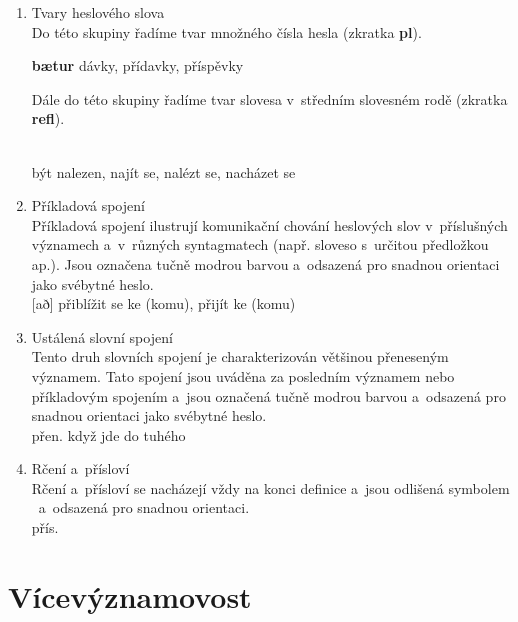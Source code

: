 \begin{enumerate}
\item Tvary heslového slova\\
Do této skupiny řadíme tvar množného čísla hesla (zkratka \textbf{pl}).

\blspace
\dicEntry {}   \textbf{bætur}  {dávky, přídavky, příspěvky}
\blspace

Dále do této skupiny řadíme tvar slovesa v~středním slovesném rodě (zkratka \textbf{refl}). 

\blspace
\dicEntry {}   \\
 {}  {být nalezen, najít se, nalézt se, nacházet se}
\blspace
\item Příkladová spojení\\
Příkladová spojení ilustrují komunikační chování heslových slov v~příslušných významech a~v~různých syntagmatech (např. sloveso s~určitou předložkou ap.). Jsou označena tučně modrou barvou a~odsazená pro snadnou orientaci jako svébytné heslo.
\blspace
\dicEntry {}   \\
[að] {} {přiblížit se ke (komu), přijít ke (komu)}
\blspace
\item Ustálená slovní spojení\\
Tento druh slovních spojení je charakterizován většinou přeneseným významem. Tato spojení jsou uváděna za posledním významem nebo příkladovým spojením a~jsou označená tučně modrou barvou a~odsazená pro snadnou orientaci jako svébytné heslo.
\blspace
\dicEntry {}   \\
 {} {\footnotesize{přen.}} {když jde do tuhého}
\blspace
\item Rčení a~přísloví\\
Rčení a~přísloví se nacházejí vždy na konci definice a~jsou odlišená symbolem \dicsymProverb\ a~odsazená pro snadnou orientaci.
\blspace
\dicEntry {}   \\
\dicProverbIntro{}  {\footnotesize{přís.}} 
\end{enumerate}

\section{Vícevýznamovost}

